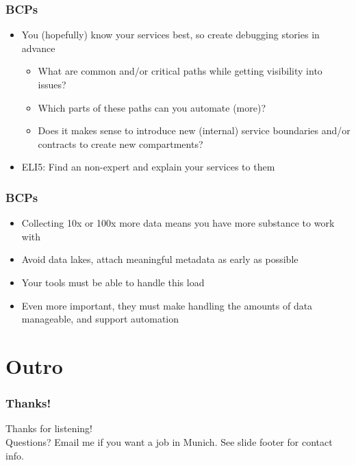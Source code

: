 \documentclass[aspectratio=169]{beamer}
\begin{document}
\begin{frame}
	\frametitle{BCPs}
	\begin{itemize}
		\item You (hopefully) know your services best, so create debugging stories in advance
		\begin{itemize}
			\item What are common and/or critical paths while getting visibility into issues?
			\item Which parts of these paths can you automate (more)?
			\item Does it makes sense to introduce new (internal) service boundaries and/or contracts to create new compartments?
		\end{itemize}
		\item ELI5: Find an non-expert and explain your services to them
	\end{itemize}
\end{frame}

\begin{frame}
	\frametitle{BCPs}
	\begin{itemize}
		\item Collecting 10x or 100x more data means you have more substance to work with
		\item Avoid data lakes, attach meaningful metadata as early as possible
		\item Your tools must be able to handle this load
		\item Even more important, they must make handling the amounts of data manageable, and support automation
	\end{itemize}
\end{frame}


\section{Outro}

\begin{frame}
	\frametitle{Thanks!}
	\begin{center}
		\vfill
		Thanks for listening!\\
		\vfill
		Questions?
		\vfill
		Email me if you want a job in Munich.
		\vfill
		See slide footer for contact info.
		\vfill
	\end{center}
\end{frame}
\end{document}
